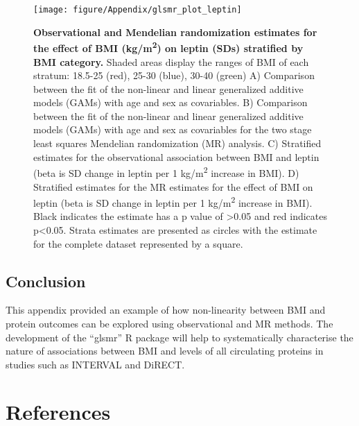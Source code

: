 \documentclass[11pt,twoside]{bristolthesis}
\begin{document}
\begin{figure}

{\centering \texttt{[image: figure/Appendix/glsmr\_plot\_leptin]} 

}

\caption[Observational and Mendelian randomization estimates for the effect of BMI on leptin stratified by BMI category.]{\textbf{Observational and Mendelian randomization estimates for the effect of BMI (kg/m\textsuperscript{2}) on leptin (SDs) stratified by BMI category.} Shaded areas display the ranges of BMI of each stratum: 18.5-25 (red), 25-30 (blue), 30-40 (green) A) Comparison between the fit of the non-linear and linear generalized additive models (GAMs) with age and sex as covariables. B) Comparison between the fit of the non-linear and linear generalized additive models (GAMs) with age and sex as covariables for the two stage least squares Mendelian randomization (MR) analysis. C) Stratified estimates for the observational association between BMI and leptin (beta is SD change in leptin per 1 kg/m\textsuperscript{2} increase in BMI). D) Stratified estimates for the MR estimates for the effect of BMI on leptin (beta is SD change in leptin per 1 kg/m\textsuperscript{2} increase in BMI). Black indicates the estimate has a p value of \textgreater0.05 and red indicates p\textless0.05. Strata estimates are presented as circles with the estimate for the complete dataset represented by a square.}\label{fig:leptin-glsmr}
\end{figure}
\hypertarget{conclusion}{%
\section{Conclusion}\label{conclusion}}

This appendix provided an example of how non-linearity between BMI and protein outcomes can be explored using observational and MR methods. The development of the ``glsmr'' R package will help to systematically characterise the nature of associations between BMI and levels of all circulating proteins in studies such as INTERVAL and DiRECT.

\backmatter

\hypertarget{references}{%
\chapter*{References}\label{references}}

\end{document}
